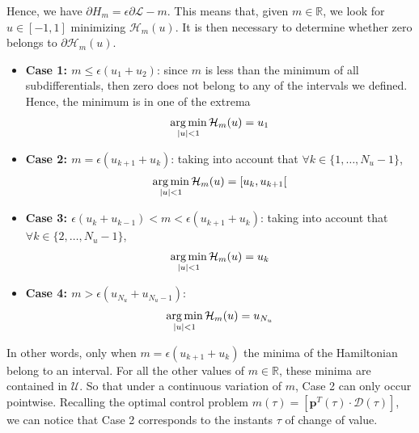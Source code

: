 Hence, we have $\partial H_m = \epsilon\partial \mathcal{L} - m$. This means that, given $m\in \mathbb{R}$, we look for $u \in [-1,1]$ minimizing $\mathcal{H}_m(u)$. It is then necessary to determine whether zero belongs to $\partial \mathcal{H}_m(u)$.

\begin{itemize}
    \item \textbf{Case 1: $m \leq \epsilon(u_1+u_2)$}: since $m$ is less than the  minimum of all subdifferentials, then zero does not belong to any of the intervals we defined. Hence, the minimum is in one of the extrema
    \begin{gather}
        \operatorname*{arg\,min}_{|u| < 1} \mathcal{H}_m(u) = u_1
    \end{gather} 
    \item \textbf{Case 2: $m = \epsilon(u_{k+1}+u_k) $}: taking into account that $\forall k \in \{1,\dots,N_u-1\}$,
    \begin{gather}
        \operatorname*{arg\,min}_{|u| < 1} \mathcal{H}_m(u) = [u_k,u_{k+1}[ 
    \end{gather} 
    \item \textbf{Case 3: $\epsilon(u_k+u_{k-1})<m<\epsilon(u_{k+1}+u_k)$}: taking into account that $\forall k \in \{2,\dots,N_u-1\}$,
    \begin{gather}
        \operatorname*{arg\,min}_{|u| < 1} \mathcal{H}_m(u) = u_k
    \end{gather}
    \item \textbf{Case 4: $m>\epsilon(u_{N_u}+u_{N_u-1})$}:
    \begin{gather}
        \operatorname*{arg\,min}_{|u| < 1} \mathcal{H}_m(u) = u_{N_u}
    \end{gather} 
\end{itemize}

In other words, only when $m = \epsilon(u_{k+1}+u_k)$ the minima of the Hamiltonian belong to an interval. For all the other values of $m\in\mathbb{R}$, these minima are contained in $\mathcal{U}$. So that under a continuous variation of $m$, Case 2 can only occur pointwise. Recalling the optimal control problem $m(\tau) = [\bm{p}^T(\tau) \cdot \bm{\mathcal{D}}(\tau)]$, we can notice that Case 2 corresponds to the instants $\tau$ of change of value.
